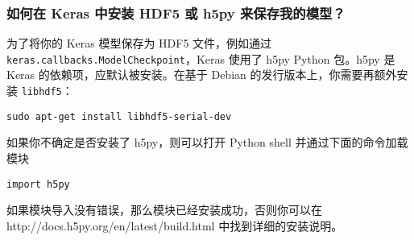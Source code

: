 \subsubsection{如何在 Keras 中安装 HDF5 或 h5py 来保存我的模型？}\label{how-can-i-install-HDF5-or-h5py-to-save-my-models-in-Keras}

为了将你的 Keras 模型保存为 HDF5 文件，例如通过 \texttt{keras.callbacks.ModelCheckpoint}，Keras 使用了 h5py Python 包。h5py 是 Keras 的依赖项，应默认被安装。在基于 Debian 的发行版本上，你需要再额外安装 \texttt{libhdf5}：

\begin{verbatim}
sudo apt-get install libhdf5-serial-dev
\end{verbatim}

如果你不确定是否安装了 h5py，则可以打开 Python shell 并通过下面的命令加载模块

\begin{verbatim}
import h5py
\end{verbatim}

如果模块导入没有错误，那么模块已经安装成功，否则你可以在 http://docs.h5py.org/en/latest/build.html 中找到详细的安装说明。

\newpage
